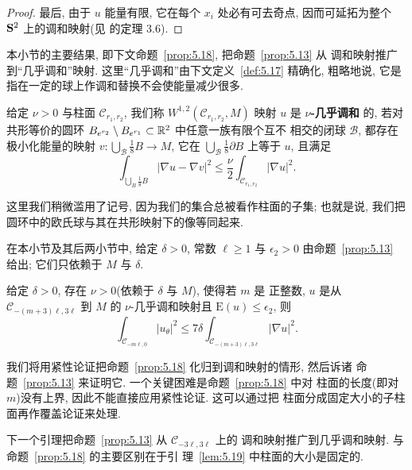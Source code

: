 \begin{proof}
最后, 由于 $u$ 能量有限, 它在每个 $x_i$ 处必有可去奇点, 因而可延拓为整个
$\mathbf{S}^2$ 上的调和映射(见 \cite{SaUh} 的定理 3.6).
\end{proof}

本小节的主要结果, 即下文命题~\ref{prop:5.18}, 把命题~\ref{prop:5.13} 从
调和映射推广到``几乎调和''映射. 这里``几乎调和''由下文定义~\ref{def:5.17}
精确化, 粗略地说, 它是指在一定的球上作调和替换不会使能量减少很多.

\begin{definition}
\label{def:5.17}
给定 $\nu>0$ 与柱面 $\mathcal{C}_{r_1,r_2}$, 我们称
$W^{1,2}(\mathcal{C}_{r_1,r_2},M)$ 映射 $u$ 是 \textbf{$\nu$-几乎调和}
的, 若对共形等价的圆环
$B_{e^{r_2}}\setminus B_{e^{r_1}}\subset\mathbb{R}^2$ 中任意一族有限个互不
相交的闭球 $\mathcal{B}$, 都存在极小化能量的映射
$v:\bigcup_{\mathcal{B}}\frac18B\to M$, 它在
$\bigcup_{\mathcal{B}}\frac18\partial B$ 上等于 $u$, 且满足
\begin{equation}
\int_{\bigcup_{B}\frac18B}|\nabla u-\nabla v|^2
\leq\frac{\nu}{2}\int_{\mathcal{C}_{r_1,r_2}}|\nabla u|^2.
\label{eq:5.60}
\end{equation}
\end{definition}

这里我们稍微滥用了记号, 因为我们的集合总被看作柱面的子集; 也就是说, 我们把
圆环中的欧氏球与其在共形映射下的像等同起来.

在本小节及其后两小节中, 给定 $\delta>0$, 常数 $\ell\geq 1$ 与
$\epsilon_2>0$ 由命题~\ref{prop:5.13} 给出; 它们只依赖于 $M$ 与 $\delta$.

\begin{proposition}
\label{prop:5.18}
给定 $\delta>0$, 存在 $\nu>0$(依赖于 $\delta$ 与 $M$), 使得若 $m$ 是
正整数, $u$ 是从 $\mathcal{C}_{-(m+3)\ell,3\ell}$ 到 $M$ 的
$\nu$-几乎调和映射且 $\mathrm{E}(u)\leq\epsilon_2$, 则
\begin{equation}
\int_{\mathcal{C}_{-m\ell,0}}|u_\theta|^2
\leq 7\delta\int_{\mathcal{C}_{-(m+3)\ell,3\ell}}|\nabla u|^2.
\label{eq:5.61}
\end{equation}
\end{proposition}

我们将用紧性论证把命题~\ref{prop:5.18} 化归到调和映射的情形, 然后诉诸
命题~\ref{prop:5.13} 来证明它. 一个关键困难是命题~\ref{prop:5.18} 中对
柱面的长度(即对 $m$)没有上界, 因此不能直接应用紧性论证. 这可以通过把
柱面分成固定大小的子柱面再作覆盖论证来处理.

下一个引理把命题~\ref{prop:5.13} 从 $\mathcal{C}_{-3\ell,3\ell}$ 上的
调和映射推广到几乎调和映射. 与命题~\ref{prop:5.18} 的主要区别在于引
理~\ref{lem:5.19} 中柱面的大小是固定的.

